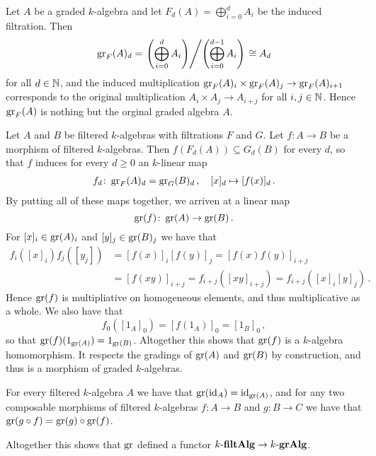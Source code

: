 \begin{example}
  \label{example: associated of graded}
  Let $A$ be a graded $k$-algebra and let $F_d(A) = \bigoplus_{i=0}^d A_i$ be the induced filtration.
  Then
  \[
          \operatorname{gr}_F(A)_d
    =     \left.
            \left( \bigoplus_{i=0}^d A_i \right)
          \middle/
            \left( \bigoplus_{i=0}^{d-1} A_i \right)
          \right.
    \cong A_d
  \]
  for all $d \in \mathbb{N}$, and the induced multiplication $\operatorname{gr}_F(A)_i \times \operatorname{gr}_F(A)_j \to \operatorname{gr}_F(A)_{i+1}$ corresponds to the original multiplication $A_i \times A_j \to A_{i+j}$ for all $i, j \in \mathbb{N}$.
  Hence $\operatorname{gr}_F(A)$ is nothing but the orginal graded algebra $A$.
\end{example}


\begin{remark}
  Let $A$ and $B$ be filtered $k$-algebras with filtrations $F$ and $G$.
  Let $f \colon A \to B$ be a morphism of filtered $k$-algebras.
  Then $f(F_d(A)) \subseteq G_d(B)$ for every $d$, so that $f$ induces for every $d \geq 0$ an $k$-linear map
  \begin{align*}
            f_d
    \colon  \operatorname{gr}_F(A)_d
    =       \operatorname{gr}_G(B)_d \,,
    \quad   [x]_d
    \mapsto [f(x)]_d \,.
  \end{align*}
  By putting all of these maps together, we arriven at a linear map
  \[
            \operatorname{gr}(f)
    \colon  \operatorname{gr}(A)
    \to     \operatorname{gr}(B) \,.
  \]
  For $[x]_i \in \operatorname{gr}(A)_i$ and $[y]_j \in \operatorname{gr}(B)_j$ we have that
  \begin{align*}
        f_i([x]_i) f_j([y_j])
    &=  [f(x)]_i [f(y)]_j
     =  [f(x) f(y)]_{i+j} \\
    &=  [f(xy)]_{i+j}
     =  f_{i+j}([xy]_{i+j})
     =  f_{i+j}([x]_i [y]_j) \,.
  \end{align*}
  Hence $\operatorname{gr}(f)$ is multipliative on homogeneous elements, and thus multiplicative as a whole.
  We also have that
  \[
      f_0([1_A]_0)
    = [f(1_A)]_0
    = [1_B]_0 \,,
  \]
  so that $\operatorname{gr}(f)(1_{\operatorname{gr}(A)}) = 1_{\operatorname{gr}(B)}$.
  Altogether this shows that $\operatorname{gr}(f)$ is a $k$-algebra homomorphism.
  It respects the gradings of $\operatorname{gr}(A)$ and $\operatorname{gr}(B)$ by construction, and thus is a morphism of graded $k$-algebras.
  
  For every filtered $k$-algebra $A$ we have that $\operatorname{gr}(\operatorname{id}_A) = \operatorname{id}_{\operatorname{gr}(A)}$, and for any two composable morphisms of filtered $k$-algebras $f \colon A \to B$ and $g \colon B \to C$ we have that $\operatorname{gr}(g \circ f) = \operatorname{gr}(g) \circ \operatorname{gr}(f)$.
  
  Altogether this shows that $\operatorname{gr}$ defined a functor $k\text{-}\mathbf{filtAlg} \to k\text{-}\mathbf{grAlg}$.
\end{remark}





